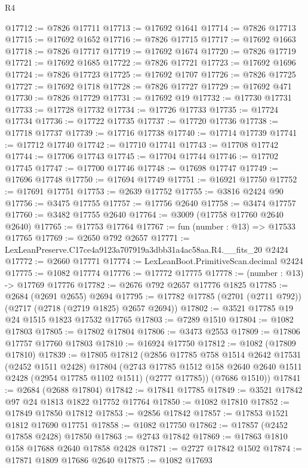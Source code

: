 \begin{lexlean}{R4}
\begin{coremodule}
@17712 := @7826 @17711
@17713 := @17692 @1641
@17714 := @7826 @17713
@17715 := @17692 @1652
@17716 := @7826 @17715
@17717 := @17692 @1663
@17718 := @7826 @17717
@17719 := @17692 @1674
@17720 := @7826 @17719
@17721 := @17692 @1685
@17722 := @7826 @17721
@17723 := @17692 @1696
@17724 := @7826 @17723
@17725 := @17692 @1707
@17726 := @7826 @17725
@17727 := @17692 @1718
@17728 := @7826 @17727
@17729 := @17692 @471
@17730 := @7826 @17729
@17731 := @17692 @19
@17732 := @17730 @17731
@17733 := @17728 @17732
@17734 := @17726 @17733
@17735 := @17724 @17734
@17736 := @17722 @17735
@17737 := @17720 @17736
@17738 := @17718 @17737
@17739 := @17716 @17738
@17740 := @17714 @17739
@17741 := @17712 @17740
@17742 := @17710 @17741
@17743 := @17708 @17742
@17744 := @17706 @17743
@17745 := @17704 @17744
@17746 := @17702 @17745
@17747 := @17700 @17746
@17748 := @17698 @17747
@17749 := @17696 @17748
@17750 := @17694 @17749
@17751 := @16921 @17750
@17752 := @17691 @17751
@17753 := @2639 @17752
@17755 := @3816 @2424 @90
@17756 := @3475 @17755
@17757 := @17756 @2640
@17758 := @3474 @17757
@17760 := @3482 @17755 @2640
@17764 := @3009 (@17758 @17760 @2640 @2640)
@17765 := @17753 @17764
@17767 := fun (number : @13) => @17533 @17765
@17769 := @2650 @792 @2657
@17771 := LexLeanPreserve.C17ce4a9123a707919a3dbb31a4ac58aa.R4.__fits_20 @2424
@17772 := @2660 @17771
@17774 := LexLeanBoot.PrimitiveScan.decimal @2424
@17775 := @1082 @17774
@17776 := @17772 @17775
@17778 := (number : @13) -> @17769 @17776
@17782 := @2676 @792 @2657 @17776 @1825
@17785 := @2684 (@2691 @2655) @2694
@17795 := @17782 @17785 (@2701 (@2711 @792)) (@2717 (@2718 (@2719 @1825) @2657 @2694))
@17802 := @3521 @17785 @19 @24 @1515 @1823 @17532 @17765
@17803 := @7289 @1510
@17804 := @1082 @17803
@17805 := @17802 @17804
@17806 := @3473 @2553
@17809 := @17806 @17757 @17760 @17803
@17810 := @16924 @17750
@17812 := @1082 (@17809 @17810)
@17839 := @17805
    @17812
    (@2856
      @17785
      @758
      @1514
      @2642
      @17531
      (@2452 @1511 @2428)
      @17804
      (@2743 @17785 @1512 @158 @2640 @2640 @1511 @2428 (@2954 @17785 @1102 @1511) (@2777 @17785))
      (@7686 @1510))
@17841 := @2684 (@2688 @17804)
@17842 := @17841 @17785
@17849 := @3521 @17842 @97 @24 @1813 @1822 @17752 @17764
@17850 := @1082 @17810
@17852 := @17849 @17850 @17812
@17853 := @2856 @17842
@17857 := @17853 @1521 @1812 @17690 @17751
@17858 := @1082 @17750
@17862 := @17857 (@2452 @17858 @2428) @17850
@17863 := @2743 @17842
@17869 := @17863 @1810 @158 @17688 @2640 @17858 @2428
@17871 := @2727 @17842 @1502
@17874 := @17871 @1809 @17686 @2640
@17875 := @1082 @17693

\end{coremodule}
\end{lexlean}
